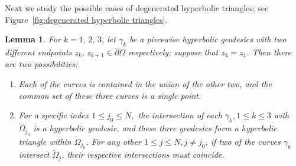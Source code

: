 \documentclass[reqno,11pt]{amsart}
\makeatletter
\def\wz{\widetilde}
\newtheorem{lem}[thm]{Lemma}%
\numberwithin{equation}{section}
\theoremstyle{remark}
\makeatother
\begin{document}
Next we study the possible cases of degenerated hyperbolic triangles; see Figure~\ref{fig:degenerated hyperbolic triangles}. 


\begin{lem}\label{degenerated triangle}
For $k=1,\,2,\,3$, let $\gamma_k$ be a piecewise hyperbolic geodesics with two 
different endpoints $z_{k},\,z_{k+1}\in\partial \Omega$ respectively; suppose that $z_4=z_1$. Then there are two possibilities: 
\begin{enumerate}[1)]
\item Each of the curves is contained in the union of the other two, and the common set of these three curves is a single point. 
\item   For a specific index $1\le j_0\le N,$ the intersection of each $\gamma_k, 1\le k\le 3$ with $\wz\Omega_{j_0}$ is a hyperbolic geodesic, and these three geodesics form a hyperbolic triangle within $\wz \Omega_{j_0}$. For any other
$1\le j\le N, j\neq j_0$, if two of the curves $\gamma_k$ intersect $\wz\Omega_j$, their respective intersections must coincide.
\end{enumerate}
\end{lem}
\end{document}
